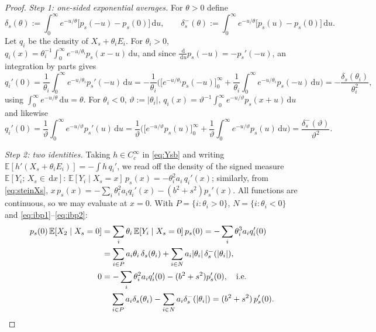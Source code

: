 \documentclass[11pt]{article}
\theoremstyle{remark}
\newcommand{\E}{\mathbb{E}}
\newcommand{\dd}{\,\mathrm{d}}
\begin{document}
\begin{proof}
\emph{Step 1: one-sided exponential averages.} For $\theta>0$ define
\[
\delta_s(\theta):=\int_0^\infty e^{-u/\theta}\big[p_s(-u)-p_s(0)\big]\dd u,\qquad
\delta_s^-(\theta):=\int_0^\infty e^{-u/\theta}\big[p_s(u)-p_s(0)\big]\dd u .
\]
Let $q_i$ be the density of $X_s+\theta_iE_i$. For $\theta_i>0$, $q_i(x)=\theta_i^{-1}\int_0^\infty e^{-u/\theta_i}p_s(x-u)\dd u$, and since
$\frac{\dd}{\dd u}p_s(-u)=-p_s'(-u)$, an integration by parts gives
\begin{equation}\label{eq:ibp1}
q_i'(0)=\frac1{\theta_i}\int_0^\infty e^{-u/\theta_i}p_s'(-u)\dd u
=-\frac1{\theta_i}\Big(\big[e^{-u/\theta_i}p_s(-u)\big]_0^\infty+\frac1{\theta_i}\int_0^\infty e^{-u/\theta_i}p_s(-u)\dd u\Big)
=-\frac{\delta_s(\theta_i)}{\theta_i^2},
\end{equation}
using $\int_0^\infty e^{-u/\theta}\dd u=\theta$. For $\theta_i<0$, $\vartheta:=|\theta_i|$, $q_i(x)=\vartheta^{-1}\int_0^\infty e^{-u/\vartheta}p_s(x+u)\dd u$ and likewise
\begin{equation}\label{eq:ibp2}
q_i'(0)=\frac1\vartheta\int_0^\infty e^{-u/\vartheta}p_s'(u)\dd u
=\frac1{\vartheta}\Big(\big[e^{-u/\vartheta}p_s(u)\big]_0^\infty+\frac1{\vartheta}\int_0^\infty e^{-u/\vartheta}p_s(u)\dd u\Big)
=\frac{\delta_s^-(\vartheta)}{\vartheta^2}.
\end{equation}

\emph{Step 2: two identities.} Taking $h\in C_c^\infty$ in \eqref{eq:Ysb} and writing $\E[h'(X_s+\theta_iE_i)]=-\int h\,q_i'$, we read off the
density of the signed measure $\E[Y_i;\,X_s\in\dd x]$: $\E[Y_i\mid X_s=x]\,p_s(x)=-\theta_i^2a_i\,q_i'(x)$; similarly, from
\eqref{eq:steinXs}, $x\,p_s(x)=-\sum_i\theta_i^2a_iq_i'(x)-(b^2+s^2)p_s'(x)$. All functions are continuous, so we may evaluate at $x=0$.
With $P=\{i:\theta_i>0\}$, $N=\{i:\theta_i<0\}$ and \eqref{eq:ibp1}--\eqref{eq:ibp2}:
\begin{align}
p_s(0)\,\E[X_2\mid X_s=0]&=\sum_i\theta_i\,\E[Y_i\mid X_s=0]\,p_s(0)=-\sum_i\theta_i^3a_iq_i'(0)\notag\\
&=\sum_{i\in P}a_i\theta_i\,\delta_s(\theta_i)+\sum_{i\in N}a_i|\theta_i|\,\delta_s^-(|\theta_i|),\label{eq:I2}\\
0&=-\sum_i\theta_i^2a_iq_i'(0)-(b^2+s^2)p_s'(0),\quad\text{i.e.}\notag\\
&\phantom{=}\ \sum_{i\in P}a_i\delta_s(\theta_i)-\sum_{i\in N}a_i\delta_s^-(|\theta_i|)=(b^2+s^2)\,p_s'(0).\label{eq:I1}
\end{align}


\end{proof}
\end{document}
